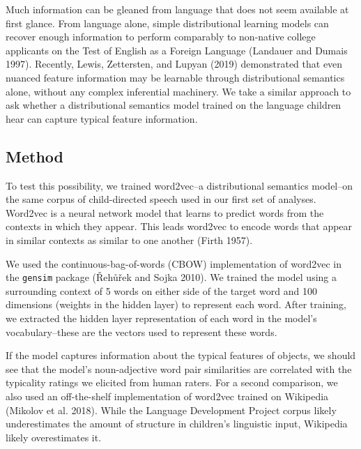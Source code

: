 \documentclass{ucetd}
\begin{document}
Much information can be gleaned from language that does not seem
available at first glance. From language alone, simple distributional
learning models can recover enough information to perform comparably to
non-native college applicants on the Test of English as a Foreign
Language (Landauer and Dumais 1997). Recently, Lewis, Zettersten, and
Lupyan (2019) demonstrated that even nuanced feature information may be
learnable through distributional semantics alone, without any complex
inferential machinery. We take a similar approach to ask whether a
distributional semantics model trained on the language children hear can
capture typical feature information.

\hypertarget{method}{%
\subsection{Method}\label{method}}

To test this possibility, we trained word2vec--a distributional
semantics model--on the same corpus of child-directed speech used in our
first set of analyses. Word2vec is a neural network model that learns to
predict words from the contexts in which they appear. This leads
word2vec to encode words that appear in similar contexts as similar to
one another (Firth 1957).

We used the continuous-bag-of-words (CBOW) implementation of word2vec in
the \texttt{gensim} package (Řehůřek and Sojka 2010). We trained the
model using a surrounding context of 5 words on either side of the
target word and 100 dimensions (weights in the hidden layer) to
represent each word. After training, we extracted the hidden layer
representation of each word in the model's vocabulary--these are the
vectors used to represent these words.

If the model captures information about the typical features of objects,
we should see that the model's noun-adjective word pair similarities are
correlated with the typicality ratings we elicited from human raters.
For a second comparison, we also used an off-the-shelf implementation of
word2vec trained on Wikipedia (Mikolov et al. 2018). While the Language
Development Project corpus likely underestimates the amount of structure
in children's linguistic input, Wikipedia likely overestimates it.
\end{document}

